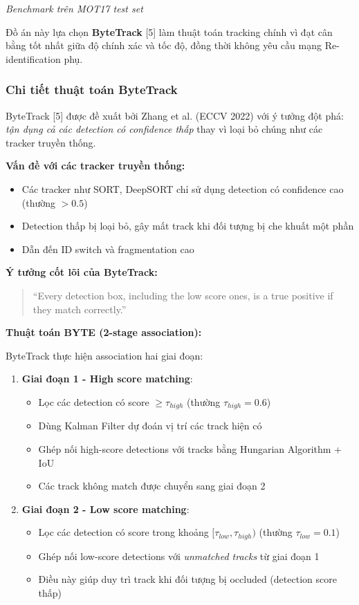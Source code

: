 \textit{Benchmark trên MOT17 test set}

Đồ án này lựa chọn \textbf{ByteTrack} [5] làm thuật toán tracking chính vì đạt cân bằng tốt nhất giữa độ chính xác và tốc độ, đồng thời không yêu cầu mạng Re-identification phụ.

\subsubsection{Chi tiết thuật toán ByteTrack}

ByteTrack [5] được đề xuất bởi Zhang et al. (ECCV 2022) với ý tưởng đột phá: \textit{tận dụng cả các detection có confidence thấp} thay vì loại bỏ chúng như các tracker truyền thống.

\textbf{Vấn đề với các tracker truyền thống:}
\begin{itemize}
    \item Các tracker như SORT, DeepSORT chỉ sử dụng detection có confidence cao (thường $> 0.5$)
    \item Detection thấp bị loại bỏ, gây mất track khi đối tượng bị che khuất một phần
    \item Dẫn đến ID switch và fragmentation cao
\end{itemize}

\textbf{Ý tưởng cốt lõi của ByteTrack:}

\begin{quote}
``Every detection box, including the low score ones, is a true positive if they match correctly.''
\end{quote}

\textbf{Thuật toán BYTE (2-stage association):}

ByteTrack thực hiện association hai giai đoạn:

\begin{enumerate}
    \item \textbf{Giai đoạn 1 - High score matching}:
    \begin{itemize}
        \item Lọc các detection có score $\geq \tau_{high}$ (thường $\tau_{high} = 0.6$)
        \item Dùng Kalman Filter dự đoán vị trí các track hiện có
        \item Ghép nối high-score detections với tracks bằng Hungarian Algorithm + IoU
        \item Các track không match được chuyển sang giai đoạn 2
    \end{itemize}
    
    \item \textbf{Giai đoạn 2 - Low score matching}:
    \begin{itemize}
        \item Lọc các detection có score trong khoảng $[\tau_{low}, \tau_{high})$ (thường $\tau_{low} = 0.1$)
        \item Ghép nối low-score detections với \textit{unmatched tracks} từ giai đoạn 1
        \item Điều này giúp duy trì track khi đối tượng bị occluded (detection score thấp)
    \end{itemize}
\end{enumerate}

